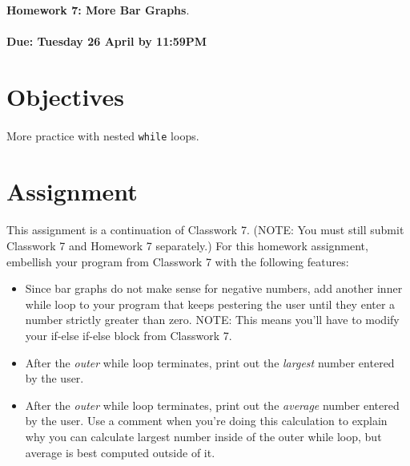 \documentclass[letter,11pt]{article}
\begin{document}
\huge
\textbf{Homework 7: More Bar Graphs}.
\normalsize
\\ ~~ \\
\textbf{Due: Tuesday 26 April by 11:59PM}

\section*{Objectives}
\paragraph{}More practice with nested \texttt{while} loops.

\section*{Assignment}
\paragraph{}This assignment is a continuation of Classwork 7. (NOTE: You must still submit Classwork 7 and Homework 7 separately.) For this homework assignment, embellish your program from Classwork 7 with the following features:
\begin{itemize}
    \item Since bar graphs do not make sense for negative numbers, add another inner while loop to your program that keeps pestering the user until they enter a number strictly greater than zero. NOTE: This means you’ll have to modify your if-else if-else block from Classwork 7.
    \item After the \textit{outer} while loop terminates, print out the \textit{largest} number entered by the user.
    \item After the \textit{outer} while loop terminates, print out the \textit{average} number entered by the user. Use a comment when you're doing this calculation to explain why you can calculate largest number inside of the outer while loop, but average is best computed outside of it.
\end{itemize}
\end{document}
